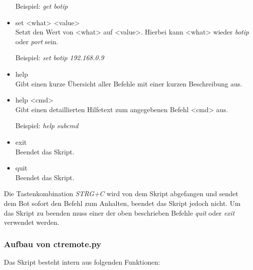 \begin{itemize}
	Beispiel: \textit{get botip}
	\item set <what> <value>\\
	Setzt den Wert von <what> auf <value>. Hierbei kann <what> wieder \textit{botip} oder \textit{port} sein.
	
	Beispiel: \textit{set botip 192.168.0.9}
	\item help\\
	Gibt einen kurze Übersicht aller Befehle mit einer kurzen Beschreibung aus.
	\item help <cmd>\\
	Gibt einen detaillierten Hilfetext zum angegebenen Befehl <cmd> aus.
	
	Beispiel: \textit{help subcmd}
	\item exit\\
	Beendet das Skript.
	\item quit\\
	Beendet das Skript.
\end{itemize}
Die Tastenkombination \textit{STRG+C} wird von dem Skript abgefangen und sendet dem Bot sofort den Befehl zum Anhalten, beendet das Skript jedoch nicht. Um das Skript zu beenden muss einer der oben beschrieben Befehle \textit{quit} oder \textit{exit} verwendet werden.

\subsubsection{Aufbau von ctremote.py}
Das Skript besteht intern aus folgenden Funktionen:

